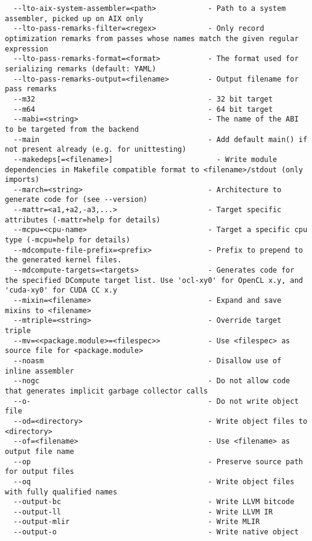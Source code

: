 \documentclass{studrep}
\begin{document}
\begin{verbatim}
  --lto-aix-system-assembler=<path>            - Path to a system assembler, picked up on AIX only
  --lto-pass-remarks-filter=<regex>            - Only record optimization remarks from passes whose names match the given regular expression
  --lto-pass-remarks-format=<format>           - The format used for serializing remarks (default: YAML)
  --lto-pass-remarks-output=<filename>         - Output filename for pass remarks
  --m32                                        - 32 bit target
  --m64                                        - 64 bit target
  --mabi=<string>                              - The name of the ABI to be targeted from the backend
  --main                                       - Add default main() if not present already (e.g. for unittesting)
  --makedeps[=<filename>]                        - Write module dependencies in Makefile compatible format to <filename>/stdout (only imports)
  --march=<string>                             - Architecture to generate code for (see --version)
  --mattr=<a1,+a2,-a3,...>                     - Target specific attributes (-mattr=help for details)
  --mcpu=<cpu-name>                            - Target a specific cpu type (-mcpu=help for details)
  --mdcompute-file-prefix=<prefix>             - Prefix to prepend to the generated kernel files.
  --mdcompute-targets=<targets>                - Generates code for the specified DCompute target list. Use 'ocl-xy0' for OpenCL x.y, and 'cuda-xy0' for CUDA CC x.y
  --mixin=<filename>                           - Expand and save mixins to <filename>
  --mtriple=<string>                           - Override target triple
  --mv=<<package.module>=<filespec>>           - Use <filespec> as source file for <package.module>
  --noasm                                      - Disallow use of inline assembler
  --nogc                                       - Do not allow code that generates implicit garbage collector calls
  --o-                                         - Do not write object file
  --od=<directory>                             - Write object files to <directory>
  --of=<filename>                              - Use <filename> as output file name
  --op                                         - Preserve source path for output files
  --oq                                         - Write object files with fully qualified names
  --output-bc                                  - Write LLVM bitcode
  --output-ll                                  - Write LLVM IR
  --output-mlir                                - Write MLIR
  --output-o                                   - Write native object

\end{verbatim}
\end{document}
